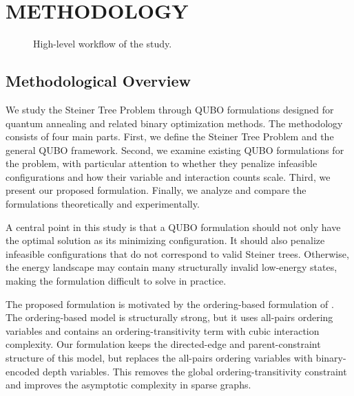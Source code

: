 \documentclass[a4paper,12pt]{report}
\begin{document}
\chapter{METHODOLOGY}

\begin{figure}[htbp]
\centering
{}
\caption{High-level workflow of the study.}
\label{fig:methodology_workflow}
\end{figure}

\section{Methodological Overview}

We study the Steiner Tree Problem through QUBO formulations designed for quantum annealing and related binary optimization methods. The methodology consists of four main parts. First, we define the Steiner Tree Problem and the general QUBO framework. Second, we examine existing QUBO formulations for the problem, with particular attention to whether they penalize infeasible configurations and how their variable and interaction counts scale. Third, we present our proposed formulation. Finally, we analyze and compare the formulations theoretically and experimentally.

A central point in this study is that a QUBO formulation should not only have the optimal solution as its minimizing configuration. It should also penalize infeasible configurations that do not correspond to valid Steiner trees. Otherwise, the energy landscape may contain many structurally invalid low-energy states, making the formulation difficult to solve in practice.

The proposed formulation is motivated by the ordering-based formulation of \cite{alex_2017}. The ordering-based model is structurally strong, but it uses all-pairs ordering variables and contains an ordering-transitivity term with cubic interaction complexity. Our formulation keeps the directed-edge and parent-constraint structure of this model, but replaces the all-pairs ordering variables with binary-encoded depth variables. This removes the global ordering-transitivity constraint and improves the asymptotic complexity in sparse graphs.
\end{document}
